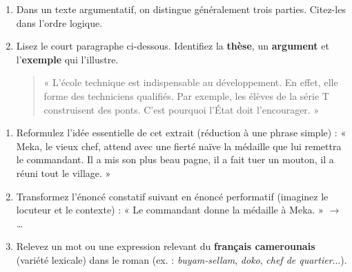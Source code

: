\documentclass[11pt]{article}
\begin{document}
\begin{exercice}
\begin{enumerate}
    \item Dans un texte argumentatif, on distingue généralement trois parties. Citez-les dans l'ordre logique.
    \item Lisez le court paragraphe ci-dessous. Identifiez la \textbf{thèse}, un \textbf{argument} et l'\textbf{exemple} qui l'illustre.
    \begin{quote}
    « L'école technique est indispensable au développement. En effet, elle forme des techniciens qualifiés. Par exemple, les élèves de la série T construisent des ponts. C'est pourquoi l'État doit l'encourager. »
    \end{quote}
\end{enumerate}
\end{exercice}

\begin{exercice}
\begin{enumerate}
    \item Reformulez l'idée essentielle de cet extrait (réduction à une phrase simple) :
    « Meka, le vieux chef, attend avec une fierté naïve la médaille que lui remettra le commandant. Il a mis son plus beau pagne, il a fait tuer un mouton, il a réuni tout le village. »
    \item Transformez l'énoncé constatif suivant en énoncé performatif (imaginez le locuteur et le contexte) :
    « Le commandant donne la médaille à Meka. » $\rightarrow$ \ldots
    \item Relevez un mot ou une expression relevant du \textbf{français camerounais} (variété lexicale) dans le roman (ex. : \textit{buyam-sellam}, \textit{doko}, \textit{chef de quartier}...).
\end{enumerate}
\end{exercice}
\end{document}
